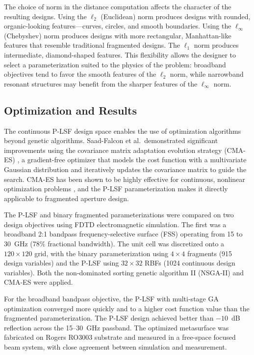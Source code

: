 The choice of norm in the distance computation affects the character of the resulting designs.  Using the $\ell_2$ (Euclidean) norm produces designs with rounded, organic-looking features---curves, circles, and smooth boundaries.  Using the $\ell_\infty$ (Chebyshev) norm produces designs with more rectangular, Manhattan-like features that resemble traditional fragmented designs.  The $\ell_1$ norm produces intermediate, diamond-shaped features.  This flexibility allows the designer to select a parameterization suited to the physics of the problem: broadband objectives tend to favor the smooth features of the $\ell_2$ norm, while narrowband resonant structures may benefit from the sharper features of the $\ell_\infty$ norm.

\subsection{Optimization and Results}

The continuous P-LSF design space enables the use of optimization algorithms beyond genetic algorithms.  Saad-Falcon et al.\ demonstrated significant improvements using the covariance matrix adaptation evolution strategy (CMA-ES) \cite{Hansen2003CMA}, a gradient-free optimizer that models the cost function with a multivariate Gaussian distribution and iteratively updates the covariance matrix to guide the search.  CMA-ES has been shown to be highly effective for continuous, nonlinear optimization problems \cite{Gregory2011CMAES}, and the P-LSF parameterization makes it directly applicable to fragmented aperture design.

The P-LSF and binary fragmented parameterizations were compared on two design objectives using FDTD electromagnetic simulation.  The first was a broadband 2:1 bandpass frequency-selective surface (FSS) operating from 15 to 30~GHz (78\% fractional bandwidth).  The unit cell was discretized onto a $120 \times 120$ grid, with the binary parameterization using $4 \times 4$ fragments (915 design variables) and the P-LSF using $32 \times 32$ RBFs (1024 continuous design variables).  Both the non-dominated sorting genetic algorithm II (NSGA-II) \cite{Deb2002NSGAII} and CMA-ES were applied.

For the broadband bandpass objective, the P-LSF with multi-stage GA optimization converged more quickly and to a higher cost function value than the fragmented parameterization.  The P-LSF design achieved better than $-10$~dB reflection across the 15--30~GHz passband.  The optimized metasurface was fabricated on Rogers RO3003 substrate and measured in a free-space focused beam system, with close agreement between simulation and measurement.

